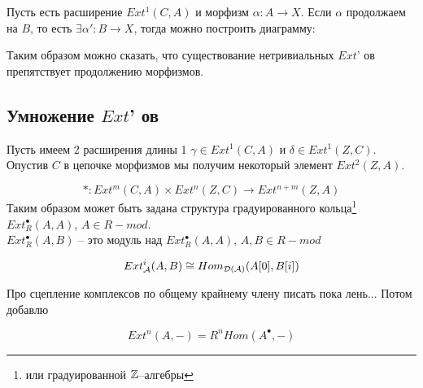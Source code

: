 \documentclass[../main.tex]{subfiles}
\begin{document}
Пусть есть расширение $Ext^1(C, A)$ и морфизм $\alpha\colon A\rightarrow X$. Если $\alpha$ продолжаем на $B$, то есть $\exists \alpha' \colon B \rightarrow X$, тогда можно построить диаграмму:
\bee
{}
\eee
Таким образом можно сказать, что существование нетривиальных $Ext$' ов препятствует продолжению морфизмов.
\subsection{Умножение $Ext$' ов}
Пусть имеем 2 расширения длины 1 $\gamma \in Ext^1(C, A)$ и $\delta \in Ext^1(Z, C)$. Опустив $C$ в цепочке морфизмов мы получим некоторый элемент $Ext^2(Z, A)$.
\bee
{}
\eee
\[
* \colon Ext^m (C, A) \times Ext^n(Z, C) \rightarrow Ext^{n+m}(Z, A)
\]
Таким образом может быть задана структура градуированного кольца\footnote{или градуированной $\mathbb{Z}$--алгебры} $Ext_{R}^\bullet (A, A)$, $A\in R-mod $.\\
$Ext_{R}^\bullet(A, B)$ -- это модуль над $Ext_{R}^\bullet(A, A)$, $A, B \in R-mod $
\begin{to_claim}
\[Ext_{\mathcal{A}}^i(A, B) \cong Hom_{\mathcal{D(A)}}(A[0], B[i])\]
\bee
\eee
\end{to_claim}
{\color{green} Про сцепление комплексов по общему крайнему члену писать пока лень... Потом добавлю}
\begin{to_claim}
\[
Ext^n(A, -) = R^n Hom(A^\bullet, -)
\]
\end{to_claim}
\end{document}
